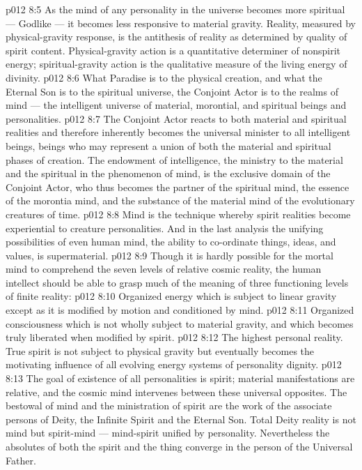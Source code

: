 \vs p012 8:5 As the mind of any personality in the universe becomes more spiritual --- Godlike --- it becomes less responsive to material gravity. Reality, measured by physical\hyp{}gravity response, is the antithesis of reality as determined by quality of spirit content. Physical\hyp{}gravity action is a quantitative determiner of nonspirit energy; spiritual\hyp{}gravity action is the qualitative measure of the living energy of divinity.
\vs p012 8:6 \pc What Paradise is to the physical creation, and what the Eternal Son is to the spiritual universe, the Conjoint Actor is to the realms of mind --- the intelligent universe of material, morontial, and spiritual beings and personalities.
\vs p012 8:7 The Conjoint Actor reacts to both material and spiritual realities and therefore inherently becomes the universal minister to all intelligent beings, beings who may represent a union of both the material and spiritual phases of creation. The endowment of intelligence, the ministry to the material and the spiritual in the phenomenon of mind, is the exclusive domain of the Conjoint Actor, who thus becomes the partner of the spiritual mind, the essence of the morontia mind, and the substance of the material mind of the evolutionary creatures of time.
\vs p012 8:8 Mind is the technique whereby spirit realities become experiential to creature personalities. And in the last analysis the unifying possibilities of even human mind, the ability to co\hyp{}ordinate things, ideas, and values, is supermaterial.
\vs p012 8:9 \pc Though it is hardly possible for the mortal mind to comprehend the seven levels of relative cosmic reality, the human intellect should be able to grasp much of the meaning of three functioning levels of finite reality:
\vs p012 8:10 \bibnobreakspace {} Organized energy which is subject to linear gravity except as it is modified by motion and conditioned by mind.
\vs p012 8:11 \bibnobreakspace {} Organized consciousness which is not wholly subject to material gravity, and which becomes truly liberated when modified by spirit.
\vs p012 8:12 \bibnobreakspace {} The highest personal reality. True spirit is not subject to physical gravity but eventually becomes the motivating influence of all evolving energy systems of personality dignity.
\vs p012 8:13 \pc The goal of existence of all personalities is spirit; material manifestations are relative, and the cosmic mind intervenes between these universal opposites. The bestowal of mind and the ministration of spirit are the work of the associate persons of Deity, the Infinite Spirit and the Eternal Son. Total Deity reality is not mind but spirit\hyp{}mind --- mind\hyp{}spirit unified by personality. Nevertheless the absolutes of both the spirit and the thing converge in the person of the Universal Father.
